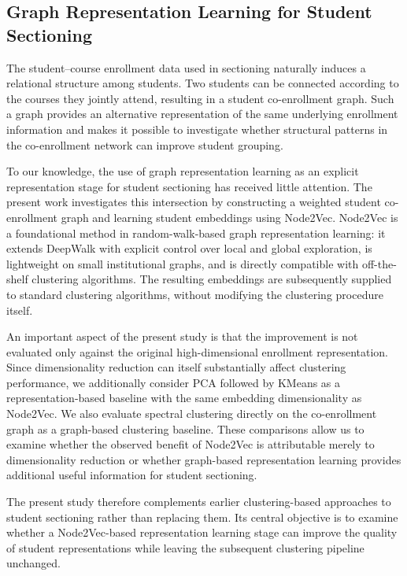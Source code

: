 \documentclass[pdflatex,sn-mathphys-num,iicol]{sn-jnl}%
\theoremstyle{thmstyleone}%
\theoremstyle{thmstyletwo}%
\theoremstyle{thmstylethree}%
\begin{document}
\subsection{Graph Representation Learning for Student Sectioning}

The student--course enrollment data used in sectioning naturally induces a relational structure among students. Two students can be connected according to the courses they jointly attend, resulting in a student co-enrollment graph. Such a graph provides an alternative representation of the same underlying enrollment information and makes it possible to investigate whether structural patterns in the co-enrollment network can improve student grouping.

To our knowledge, the use of graph representation learning as an explicit representation stage for student sectioning has received little attention. The present work investigates this intersection by constructing a weighted student co-enrollment graph and learning student embeddings using Node2Vec. Node2Vec is a foundational method in random-walk-based graph representation learning: it extends DeepWalk with explicit control over local and global exploration, is lightweight on small institutional graphs, and is directly compatible with off-the-shelf clustering algorithms. The resulting embeddings are subsequently supplied to standard clustering algorithms, without modifying the clustering procedure itself.

An important aspect of the present study is that the improvement is not evaluated only against the original high-dimensional enrollment representation. Since dimensionality reduction can itself substantially affect clustering performance, we additionally consider PCA followed by KMeans as a representation-based baseline with the same embedding dimensionality as Node2Vec. We also evaluate spectral clustering directly on the co-enrollment graph as a graph-based clustering baseline. These comparisons allow us to examine whether the observed benefit of Node2Vec is attributable merely to dimensionality reduction or whether graph-based representation learning provides additional useful information for student sectioning.

The present study therefore complements earlier clustering-based approaches to student sectioning rather than replacing them. Its central objective is to examine whether a Node2Vec-based representation learning stage can improve the quality of student representations while leaving the subsequent clustering pipeline unchanged.
\end{document}
